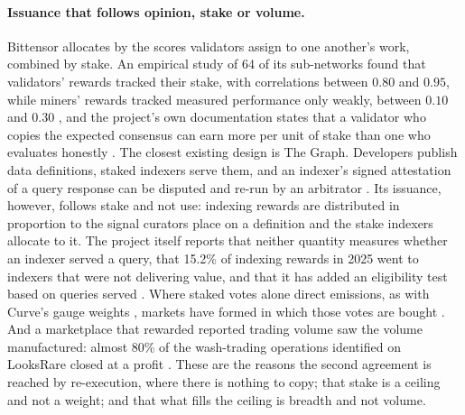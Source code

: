 \paragraph{Issuance that follows opinion, stake or volume.} Bittensor allocates by the scores
validators assign to one another's work, combined by stake. An empirical study of 64 of its sub-networks found that
validators' rewards tracked their stake, with correlations between $0.80$ and $0.95$, while miners' rewards tracked
measured performance only weakly, between $0.10$ and $0.30$ \citep{lui2025bittensor}, and the project's own
documentation states that a validator who copies the expected consensus can earn more per unit of stake than one who
evaluates honestly \citep{bittensor2026weightcopy}. The closest existing design is The Graph. Developers publish
data definitions, staked indexers serve them, and an indexer's signed attestation of a query response can be
disputed and re-run by an arbitrator \citep{thegraph2026docs}. Its issuance, however, follows stake and not use:
indexing rewards are distributed in proportion to the signal curators place on a definition and the stake indexers
allocate to it. The project itself reports that neither quantity measures whether an indexer served a query, that
15.2\% of indexing rewards in 2025 went to indexers that were not delivering value, and that it has added an
eligibility test based on queries served \citep{thegraph2026eligibility}. Where staked votes alone direct emissions,
as with Curve's gauge weights \citep{curve2026gauges}, markets have formed in which those votes are bought
\citep{votium2026docs}. And a marketplace that rewarded reported trading volume saw the volume manufactured: almost
80\% of the wash-trading operations identified on LooksRare closed at a profit \citep{lamorgia2023nft}. These are
the reasons the second agreement is reached by re-execution, where there is nothing to copy; that stake is a
ceiling and not a weight; and that what fills the ceiling is breadth and not volume.

